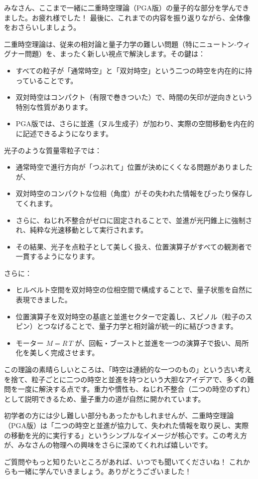 \documentclass[dvipdfmx,a4paper,oneside]{jsbook}
\begin{document}
みなさん、ここまで一緒に二重時空理論（PGA版）の量子的な部分を学んできました。お疲れ様でした！ 最後に、これまでの内容を振り返りながら、全体像をおさらいしましょう。

二重時空理論は、従来の相対論と量子力学の難しい問題（特にニュートン‐ウィグナー問題）を、まったく新しい視点で解決します。その鍵は：
\begin{itemize}
  \item すべての粒子が「通常時空」と「双対時空」という二つの時空を内在的に持っていることです。
  \item 双対時空はコンパクト（有限で巻きついた）で、時間の矢印が逆向きという特別な性質があります。
  \item PGA版では、さらに並進（ヌル生成子）が加わり、実際の空間移動を内在的に記述できるようになります。
\end{itemize}

光子のような質量零粒子では：
\begin{itemize}
  \item 通常時空で進行方向が「つぶれて」位置が決めにくくなる問題がありましたが、
  \item 双対時空のコンパクトな位相（角度）がその失われた情報をぴったり保存してくれます。
  \item さらに、ねじれ不整合がゼロに固定されることで、並進が光円錐上に強制され、純粋な光速移動として実行されます。
  \item その結果、光子を点粒子として美しく扱え、位置演算子がすべての観測者で一貫するようになります。
\end{itemize}

さらに：
\begin{itemize}
  \item ヒルベルト空間を双対時空の位相空間で構成することで、量子状態を自然に表現できました。
  \item 位置演算子を双対時空の基底と並進セクターで定義し、スピノル（粒子のスピン）とつなげることで、量子力学と相対論が統一的に結びつきます。
  \item モーター \(M = R\, T\) が、回転・ブーストと並進を一つの演算子で扱い、局所化を美しく完成させます。
\end{itemize}

この理論の素晴らしいところは、「時空は連続的な一つのもの」という古い考えを捨て、粒子ごとに二つの時空と並進を持つという大胆なアイデアで、多くの難問を一度に解決する点です。重力や慣性も、ねじれ不整合（二つの時空のずれ）として説明できるため、量子重力の道が自然に開かれています。

初学者の方には少し難しい部分もあったかもしれませんが、二重時空理論（PGA版）は「二つの時空と並進が協力して、失われた情報を取り戻し、実際の移動を光的に実行する」というシンプルなイメージが核心です。この考え方が、みなさんの物理への興味をさらに深めてくれれば嬉しいです。

ご質問やもっと知りたいところがあれば、いつでも聞いてくださいね！ これからも一緒に学んでいきましょう。ありがとうございました！
\end{document}

